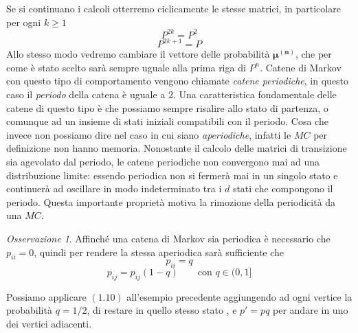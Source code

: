 \documentclass{article}
\theoremstyle{definition}
\theoremstyle{remark}
\newtheorem{remark}[theorem]{Osservazione}
\begin{document}
Se si continuano i calcoli otterremo ciclicamente le stesse matrici, in particolare  per ogni $k\ge 1$ 
$$P^{2k} = P^2$$
$$P^{2k+1} = P$$
Allo stesso modo vedremo cambiare il vettore delle probabilità $\boldsymbol{\mu^{(n)}}$, che per come è stato scelto sarà sempre uguale alla prima riga di $P^n$.
Catene di Markov con questo tipo di comportamento vengono chiamate \textit{catene periodiche}, in questo caso il \textit{periodo} della catena è uguale a 2. 
Una caratteristica fondamentale delle catene di questo tipo è che possiamo sempre risalire allo stato di partenza, o comunque ad un insieme di stati iniziali compatibili
con il periodo.
Cosa che invece non possiamo dire nel caso in cui  siano \textit{aperiodiche}, infatti le $MC$ per definizione
non hanno memoria. 
Nonostante il calcolo delle matrici di transizione sia agevolato dal periodo, le catene periodiche non convergono mai 
ad una distribuzione limite: essendo periodica non si fermerà mai in un singolo stato e continuerà ad oscillare
in modo indeterminato tra i $d$ stati  che compongono il periodo. Questa importante proprietà motiva la rimozione della 
periodicità da una $MC$.
\begin{remark}
    Affinché una catena di Markov sia periodica è necessario che $p_{ii} = 0$, quindi per rendere la stessa aperiodica sarà sufficiente che 
    $$p_{ii} = q$$
    $$p_{ij} = p_{ij}(1-q) \qquad \text{con $q\in(0,1]$}$$
\end{remark}
Possiamo applicare $(1.10)$ all'esempio precedente aggiungendo ad ogni vertice la probabilità $q=1/2$, di restare in quello stesso stato , e $p' = pq$ per andare in uno dei vertici adiacenti.
\end{document}

